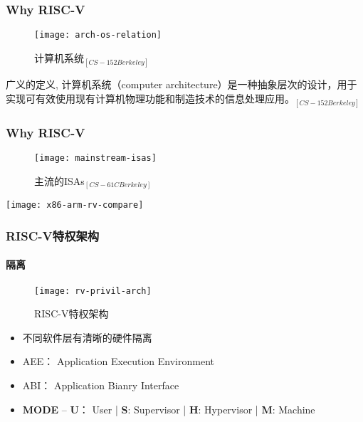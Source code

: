 \begin{frame}
	
	\frametitle{Why RISC-V}
	
	\begin{figure}
		\centering
		\texttt{[image: arch-os-relation]}
		\caption{计算机系统$_{[CS-152 Berkeley]}$}
	\end{figure}
	
	广义的定义, 计算机系统（computer architecture）是一种抽象层次的设计，用于实现可有效使用现有计算机物理功能和制造技术的信息处理应用。$_{[CS-152 Berkeley]}$
\end{frame}

\begin{frame}
	
	\frametitle{Why RISC-V}
	
	\begin{figure}
		\centering
		\texttt{[image: mainstream-isas]}
		\caption{主流的ISAs$ _{[CS-61C Berkeley]} $}
	\end{figure}
	
		\centering
		\texttt{[image: x86-arm-rv-compare]}
	
	
	
	
\end{frame}

\begin{frame}
	\frametitle{RISC-V特权架构}
	\framesubtitle{隔离}
	
	\begin{figure}
	\centering
	\texttt{[image: rv-privil-arch]}
	\caption{RISC-V特权架构}
	\end{figure}

\begin{itemize}
	
	\item 不同软件层有清晰的硬件隔离
	\item AEE： Application Execution Environment
	\item ABI： Application Bianry Interface
	\item \textbf{MODE} -- \textbf{U}： User | \textbf{S}: Supervisor | \textbf{H}: Hypervisor | \textbf{M}: Machine

\end{itemize}

\end{frame}

